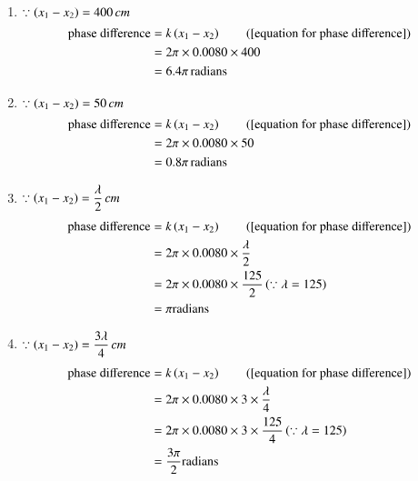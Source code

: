 \documentclass[journal,12pt,twocolumn]{IEEEtran}
\theoremstyle{remark}
\begin{document}
\begin{enumerate} [label=(\alph*)]
   \item
$\because \left(x_1 - x_2\right) = 400\, cm$ 
\begin{align}
    \text{phase difference} &= k\brak{x_1 - x_2} \tag{\ref{equation for phase difference}} \nonumber\\
    &= 2\pi \times 0.0080 \times 400 \nonumber\\
    &= 6.4 \pi\, \text{radians}
\end{align}

   \item 
$\because \left(x_1 - x_2\right) = 50\, cm$ 
\begin{align}
    \text{phase difference} &= k\brak{x_1 - x_2} \tag{\ref{equation for phase difference}} \nonumber\\
    &= 2\pi \times 0.0080 \times 50 \nonumber\\
    &= 0.8\pi \, \text{radians}
\end{align}

    \item $\because \left(x_1 - x_2\right) = \dfrac{\lambda}{2}\, cm$ 
\begin{align}
    \text{phase difference} &= k\brak{x_1 - x_2} \tag{\ref{equation for phase difference}} \nonumber\\
    &= 2\pi \times 0.0080 \times \dfrac{\lambda}{2} \\
    &= 2\pi \times 0.0080 \times \dfrac{125}{2} 
    \brak{\because \lambda=125} \nonumber \\
    &= \pi \text{radians}
\end{align}
    
    \item $\because \left(x_1 - x_2\right) = \dfrac{3\lambda}{4}\, cm$ 
\begin{align}
    \text{phase difference} &= k\brak{x_1 - x_2} \tag{\ref{equation for phase difference}} \nonumber\\
    &= 2\pi \times 0.0080 \times 3 \times \dfrac{\lambda}{4} \\
    &= 2\pi \times 0.0080 \times 3 \times \dfrac{125}{4}  \brak{\because\lambda=125} \nonumber\\
    &= \dfrac{3\pi}{2} \text{radians}
\end{align}

\end{enumerate}
\end{document}
